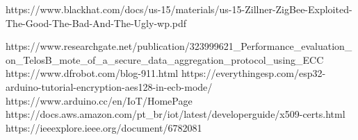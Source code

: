 \documentclass[runningheads]{llncs}
\begin{document}
 





\begin{thebibliography}{8}

 {https://www.blackhat.com/docs/us-15/materials/us-15-Zillner-ZigBee-Exploited-The-Good-The-Bad-And-The-Ugly-wp.pdf}

 {https://www.researchgate.net/publication/323999621\_Performance\_evaluation\_on\_TelosB\_mote\_of\_a\_secure\_data\_aggregation\_protocol\_using\_ECC}
 {https://www.dfrobot.com/blog-911.html}
 {https://everythingesp.com/esp32-arduino-tutorial-encryption-aes128-in-ecb-mode/}
 {https://www.arduino.cc/en/IoT/HomePage}
 {https://docs.aws.amazon.com/pt\_br/iot/latest/developerguide/x509-certs.html}
 {https://ieeexplore.ieee.org/document/6782081}
\end{thebibliography}
\end{document}
